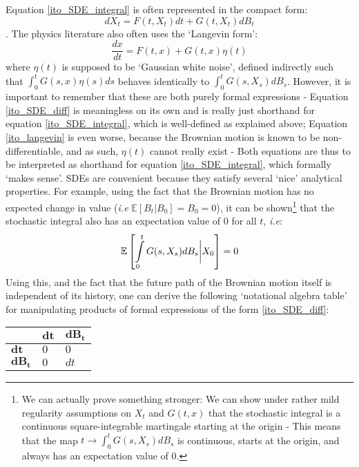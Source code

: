 Equation \eqref{ito_SDE_integral} is often represented in the compact form:
\begin{equation}
\label{ito_SDE_diff}
dX_t = F(t,X_t)dt + G(t,X_t)dB_t
\end{equation}
. The physics literature also often uses the `Langevin form':
\begin{equation}
\label{ito_langevin}
\frac{dx}{dt} = F(t,x) + G(t,x)\eta(t)
\end{equation}
where $\eta(t)$ is supposed to be `Gaussian white noise', defined indirectly such that $\int_0^{t}G(s,x)\eta(s)ds$ behaves identically to $\int_0^{t}G(s,X_s)dB_s$. However, it is important to remember that these are both purely formal expressions - Equation \eqref{ito_SDE_diff} is meaningless on its own and is really just shorthand for equation \eqref{ito_SDE_integral}, which is well-defined as explained above; Equation \eqref{ito_langevin} is even worse, because the Brownian motion is known to be non-differentiable, and as such, $\eta(t)$ cannot really exist - Both equations are thus to be interpreted as shorthand for equation \eqref{ito_SDE_integral}, which formally `makes sense'. SDEs are convenient because they satisfy several `nice' analytical properties. For example, using the fact that the Brownian motion has no expected change in value (\emph{i.e} $\mathbb{E}[B_t | B_0] = B_0 = 0$), it can be shown\footnote{We can actually prove something stronger: We can show under rather mild regularity assumptions on $X_t$ and $G(t,x)$ that the stochastic integral is a continuous square-integrable martingale starting at the origin - This means that the map $t \to \int_0^{t}G(s,X_s)dB_s$ is continuous, starts at the origin, and always has an expectation value of $0$.} that the stochastic integral also has an expectation value of $0$ for all $t$, \emph{i.e}:
\begin{equation*}
\mathbb{E}\left[\int\limits_{0}^{t} G(s,X_s)dB_s \bigg{|} X_0\right] = 0
\end{equation*}
Using this, and the fact that the future path of the Brownian motion itself is independent of its history, one can derive the following `notational algebra table' for manipulating products of formal expressions of the form \eqref{ito_SDE_diff}:
\\
\begin{center}
	\begin{tabularx}{0.4\textwidth}{ 
			| >{\centering\arraybackslash}X 
			| >{\centering\arraybackslash}X 
			| >{\centering\arraybackslash}X | }
		\hline
		& $\mathbf{dt}$ & $\mathbf{dB_t}$ \\
		\hline
		$\mathbf{dt}$ & $0$  &  $0$ \\ 
		\hline
		$\mathbf{dB_t}$ & $0$  & $dt$ \\
		\hline
	\end{tabularx}
\end{center}

